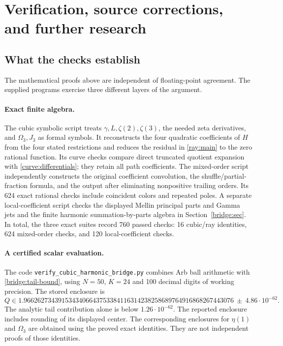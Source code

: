 \section{Verification, source corrections, and further research}
\label{sec:audit}

\subsection{What the checks establish}

The mathematical proofs above are independent of floating-point
agreement. The supplied programs exercise three different layers of
the argument.

\paragraph{Exact finite algebra.}
The cubic symbolic script treats $\gamma,L,\zeta(2),\zeta(3)$,
the needed zeta derivatives, and $\Omega_3,J_3$ as formal symbols.
It reconstructs the four quadratic coefficients of $H$ from the
four stated restrictions and reduces the residual in
\eqref{ray:main} to the zero rational function. Its curve checks
compare direct truncated quotient expansion with
\eqref{curve:differentials}; they retain all path coefficients.
The mixed-order script independently constructs the original
coefficient convolution, the shuffle/partial-fraction formula, and
the output after eliminating nonpositive trailing orders. Its 624
exact rational checks include coincident colors and repeated poles.
A separate local-coefficient script checks the displayed Mellin
principal parts and Gamma jets and the finite harmonic
summation-by-parts algebra in Section~\ref{bridge:sec}. In total,
the three exact suites record 760 passed checks: 16 cubic/ray
identities, 624 mixed-order checks, and 120 local-coefficient checks.

\paragraph{A certified scalar evaluation.}
The code \texttt{verify\_cubic\_harmonic\_bridge.py} combines
Arb ball arithmetic with \eqref{bridge:tail-bound}, using
$N=50$, $K=24$ and 100 decimal digits of working precision.
The stored enclosure is
\[
 Q\in 1.9662627343915343406643753384116314238258689764916868267443076
       \ \pm\ 4.86\cdot10^{-62}.
\]
The analytic tail contribution alone is below $1.26\cdot10^{-62}$.
The reported enclosure includes rounding of its displayed center.
The corresponding enclosures for $\eta(1)$ and $\Omega_3$ are
obtained using the proved exact identities. They are not independent
proofs of those identities.

